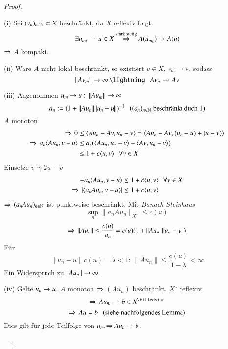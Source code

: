 \begin{proof}
    \begin{description}
    \item{(i)}
        Sei $(v_n)_{n\in \mathbb{N}}\subset X$ beschränkt, da $X$ reflexiv folgt:
        \[
            \exists u_{m_k} \rightharpoonup u \in X\overset{\text{stark stetig}}{\Rightarrow} A(u_{m_k})\rightarrow A(u)
        \]
        $\Rightarrow$ $A$ kompakt.
    \item{(ii)}
    Wäre $A$ nicht lokal beschränkt, so existiert $v\in X$, $v_m\rightarrow v$, sodass
    \[
        \|Av_m\|\ra \infty\, \lightning  \qq Av_m \rightharpoonup Av
    \]
    \item{(iii)}
    Angenommen $u_m\rightarrow u: \, \|Au_m\|\rightarrow \infty$
    \[
        a_n:=(1+\|Au_n\|\|u_n-u\|)^{-1} \hspace{.25cm} ((a_n)_{n\in \mathbb{N}} \text{ beschränkt duch $1$})
    \]
    $A$ monoton
    \begin{align*}
        \Rightarrow \, 0&\leq \langle Au_n-Av,u_n-v\rangle= \langle Au_n-Av,(u_n-u)+(u-v)\rangle\\
        \Rightarrow\, a_n\langle Au_n,v-u\rangle &\leq a_n(\langle Au_n,u_n-v\rangle-\langle Av,u_n-v\rangle)\\
        &\leq 1+ c\langle u,v\rangle \hspace{.25cm} \forall v\in X
    \end{align*}
    Einsetze $v\leadsto 2u-v$
    \begin{align*}
        -a_n \langle Au_n,v-u\rangle&\leq 1+\tilde c\langle u,v\rangle \hspace{.25cm} \forall v \in X\\
        \Rightarrow \, |\langle a_n A u_n,v-u\rangle|&\leq 1+c\langle u,v\rangle
    \end{align*}
    $\Rightarrow \, (a_nAu_n)_{n\in \mathbb{N}}$ ist punktweise beschränkt. Mit \textit{Banach-Steinhaus}
    \[
        \sup_n\|a_nAu_n\|_{X^\star}\leq c(u)
    \]
    \[
        \Rightarrow \, \|Au_n\|\leq \frac{c(u)}{a_n} = c(u)(1+\|Au_n\|\|u_n-v\|)
    \]
    Für
    \[
        \|u_n-u\|c(u)=\lambda <1: \, \|Au_n\|\leq \frac{c(u)}{1-\lambda}<\infty
    \]
    Ein Widerspruch zu $\|Au_n\|\rightarrow \infty$.
    \item{(iv)}
    Gelte $u_n\rightarrow u$. $A$ monoton $\Rightarrow$ $(Au_n)$ beschränkt.
    $X^\star$ reflexiv
    \[
        \Ra \, Au_{n_k}\rightharpoonup b \in X^\star
    \]
    \[
        \Rightarrow \, Au=b \hspace{.25cm} \text{(siehe nachfolgendes Lemma)}
    \]
    Dies gilt für jede Teilfolge von $u_n, \Rightarrow  Au_n \rightharpoonup b$.
    \end{description}
    \[ \]
\end{proof}

